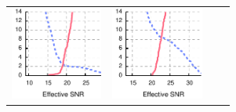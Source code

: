 \begin{figure}[p]
\begin{xtrafullpage}
\begin{tabular}{cccc}
	\includegraphics[height=1.2in]{figures/delivery_figures/goodbad/esnr_goodbad_6.pdf} &
	\includegraphics[height=1.2in]{figures/delivery_figures/goodbad/esnr_goodbad_7.pdf} \\


\end{tabular}
\end{xtrafullpage}
\end{figure}
